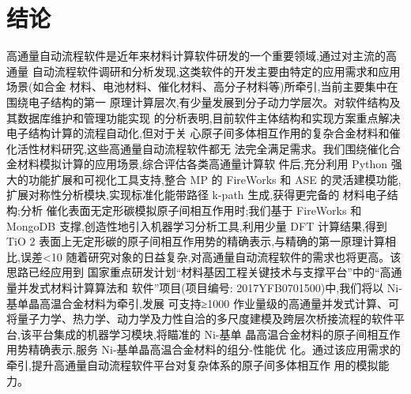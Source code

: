 \chapter{结论}
高通量自动流程软件是近年来材料计算软件研发的一个重要领域,通过对主流的高通量
自动流程软件调研和分析发现,这类软件的开发主要由特定的应用需求和应用场景(如合金
材料、电池材料、催化材料、高分子材料等)所牵引,当前主要集中在围绕电子结构的第一
原理计算层次,有少量发展到分子动力学层次。对软件结构及其数据库维护和管理功能实现
的分析表明,目前软件主体结构和实现方案重点解决电子结构计算的流程自动化,但对于关
心原子间多体相互作用的复杂合金材料和催化活性材料研究,这些高通量自动流程软件都无
法完全满足需求。我们围绕催化合金材料模拟计算的应用场景,综合评估各类高通量计算软
件后,充分利用 Python 强大的功能扩展和可视化工具支持,整合 MP 的 FireWorks 和 ASE
的灵活建模功能,扩展对称性分析模块,实现标准化能带路径 k-path 生成,获得更完备的
材料电子结构;分析  催化表面无定形碳模拟原子间相互作用时;我们基于 FireWorks
和 MongoDB 支撑,创造性地引入机器学习分析工具,利用少量 DFT 计算结果,得到 TiO 2
表面上无定形碳的原子间相互作用势的精确表示,与精确的第一原理计算相比,误差<10%
随着研究对象的日益复杂,对高通量自动流程软件的需求也将更高。该思路已经应用到
国家重点研发计划“材料基因工程关键技术与支撑平台”中的“高通量并发式材料计算算法和
软件”项目(项目编号: 2017YFB0701500)中,我们将以 Ni-基单晶高温合金材料为牵引,发展
可支持≥1000 作业量级的高通量并发式计算、可将量子力学、热力学、动力学及力性自洽的多尺度建模及跨层次桥接流程的软件平台,该平台集成的机器学习模块,将瞄准的 Ni-基单
晶高温合金材料的原子间相互作用势精确表示,服务 Ni-基单晶高温合金材料的组分-性能优
化。通过该应用需求的牵引,提升高通量自动流程软件平台对复杂体系的原子间多体相互作
用的模拟能力。
